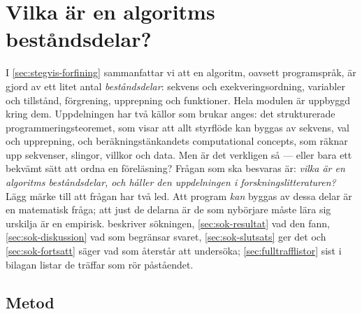 \chapter{Vilka är en algoritms beståndsdelar?}
\label{app:sokprotokoll}

I \cref{sec:stegvis-forfining} sammanfattar vi att en algoritm, oavsett
programspråk, är gjord av ett litet antal \emph{beståndsdelar}: sekvens och
exekveringsordning, variabler och tillstånd, förgrening, upprepning och
funktioner.  Hela modulen är uppbyggd kring dem.  Uppdelningen har två
källor som brukar anges: det strukturerade programmeringsteoremet, som
visar att allt styrflöde kan byggas av sekvens, val och
upprepning\autocite{bohm1966}, och beräkningstänkandets
\foreignlanguage{english}{computational concepts}, som räknar upp
sekvenser, slingor, villkor och data\autocite{brennan2012}.  Men är det
verkligen så --- eller bara ett bekvämt sätt att ordna en föreläsning?
Frågan som ska besvaras är: \emph{vilka är en algoritms beståndsdelar,
och håller den uppdelningen i forskningslitteraturen?}  Lägg märke till
att frågan har två led.  Att program \emph{kan} byggas av dessa delar är
en matematisk fråga; att just de delarna är de som nybörjare måste lära
sig urskilja är en empirisk.   beskriver sökningen,
\cref{sec:sok-resultat} vad den fann, \cref{sec:sok-diskussion} vad som
begränsar svaret, \cref{sec:sok-slutsats} ger det och
\cref{sec:sok-fortsatt} säger vad som återstår att undersöka;
\cref{sec:fulltrafflistor} sist i bilagan listar de träffar som rör
påståendet.

\section{Metod}
\label{sec:sok-metod}

